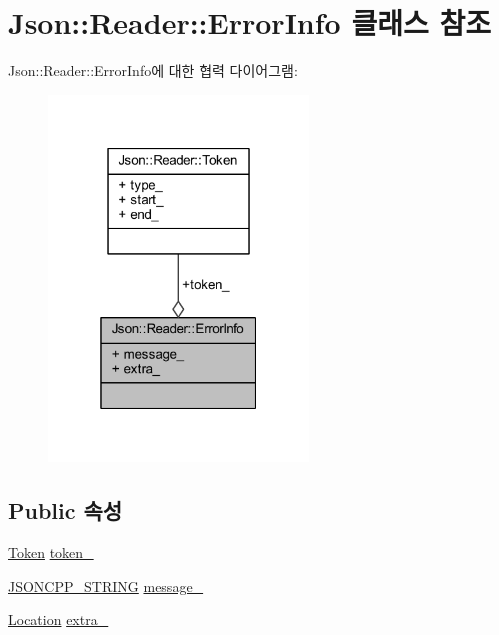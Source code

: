 \hypertarget{class_json_1_1_reader_1_1_error_info}{}\section{Json\+:\+:Reader\+:\+:Error\+Info 클래스 참조}
\label{class_json_1_1_reader_1_1_error_info}


Json\+:\+:Reader\+:\+:Error\+Info에 대한 협력 다이어그램\+:\nopagebreak
\begin{figure}[H]
\begin{center}
\leavevmode
\includegraphics[width=196pt]{class_json_1_1_reader_1_1_error_info__coll__graph}
\end{center}
\end{figure}
\subsection*{Public 속성}
\begin{DoxyCompactItemize}
\item 
\hyperlink{class_json_1_1_reader_1_1_token}{Token} \hyperlink{class_json_1_1_reader_1_1_error_info_a52e1c71b12eb1c3f0395d7ef1e778ce6}{token\+\_\+}
\item 
\hyperlink{json_8h_a1e723f95759de062585bc4a8fd3fa4be}{J\+S\+O\+N\+C\+P\+P\+\_\+\+S\+T\+R\+I\+NG} \hyperlink{class_json_1_1_reader_1_1_error_info_a3529d420f7c83165565bf294a5d6ed13}{message\+\_\+}
\item 
\hyperlink{class_json_1_1_reader_a46795b5b272bf79a7730e406cb96375a}{Location} \hyperlink{class_json_1_1_reader_1_1_error_info_af92c24acf642b040d6e40aac4952d44d}{extra\+\_\+}
\end{DoxyCompactItemize}


